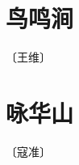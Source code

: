 \documentclass[12pt,UTF-8,openany]{ctexbook}
\begin{document}
\vspace{8pt}


\section{鸟鸣涧}

\begin{center}
    \vspace{10pt}
    
    \begin{normalsize}
        
        〔王维〕
        
    \end{normalsize}
    
    \vspace{8pt}
    
    \begin{large}
        
        
        
    \end{large}
    
\end{center}

\vspace{8pt}


\section{咏华山}

\begin{center}
    \vspace{10pt}
    
    \begin{normalsize}
        
        〔寇准〕
        
    \end{normalsize}
    
    \vspace{8pt}
    
    \begin{large}
        
        
        
    \end{large}
    
\end{center}
\end{document}
